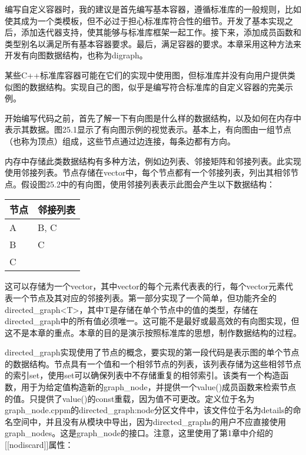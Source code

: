 编写自定义容器时，我的建议是首先编写基本容器，遵循标准库的一般规则，比如使其成为一个类模板，但不必过于担心标准库符合性的细节。开发了基本实现之后，添加迭代器支持，使其能够与标准库框架一起工作。接下来，添加成员函数和类型别名以满足所有基本容器要求。最后，满足容器的要求。本章采用这种方法来开发有向图数据结构，也称为digraph。


某些C++标准库容器可能在它们的实现中使用图，但标准库并没有向用户提供类似图的数据结构。实现自己的图，似乎是编写符合标准库的自定义容器的完美示例。

开始编写代码之前，首先了解一下有向图是什么样的数据结构，以及如何在内存中表示其数据。图25.1显示了有向图示例的视觉表示。基本上，有向图由一组节点（也称为顶点）组成，这些节点通过边连接，每条边都有方向。


内存中存储此类数据结构有多种方法，例如边列表、邻接矩阵和邻接列表。此实现使用邻接列表。节点存储在vector中，每个节点都有一个邻接列表，列出其相邻节点。假设图25.2中的有向图，使用邻接列表表示此图会产生以下数据结构：


\begin{longtable}{|l|l|}
\hline
\textbf{节点} & \textbf{邻接列表} \\ \hline
\endfirsthead
%
\endhead
%
A             & B, C                    \\ \hline
B             & C                       \\ \hline
C             &                         \\ \hline
\end{longtable}

这可以存储为一个vector，其中vector的每个元素代表表的行，每个vector元素代表一个节点及其对应的邻接列表。第一部分实现了一个简单，但功能齐全的directed\_graph<T>，其中T是存储在单个节点中的值的类型，存储在directed\_graph中的所有值必须唯一。这可能不是最好或最高效的有向图实现，但这不是本章的重点。本章的目的是演示按照标准库的思想，制作数据结构的过程。


directed\_graph实现使用了节点的概念，要实现的第一段代码是表示图的单个节点的数据结构。节点具有一个值和一个相邻节点的列表，该列表存储为这些相邻节点的索引set，使用set可以确保列表中不存储重复的相邻索引。该类有一个构造函数，用于为给定值构造新的graph\_node，并提供一个value()成员函数来检索节点的值。只提供了value()的const重载，因为值不可更改。定义位于名为graph\_node.cppm的directed\_graph:node分区文件中，该文件位于名为details的命名空间中，并且没有从模块中导出，因为directed\_graphs的用户不应直接使用graph\_nodes。这是graph\_node的接口。注意，这里使用了第1章中介绍的[[nodiscard]]属性：

